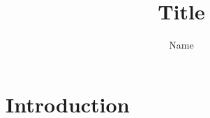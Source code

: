 \documentclass{beamer}
\title{Title}
\author{Name}
\begin{document}
\maketitle

\section{Introduction}
\end{document}
